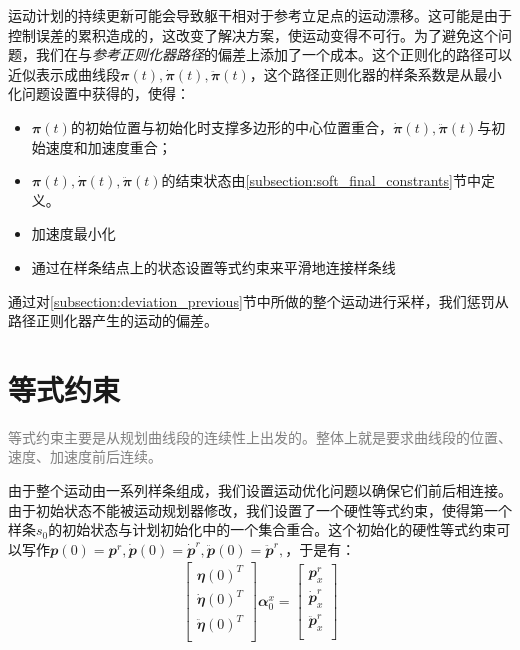 运动计划的持续更新可能会导致躯干相对于参考立足点的运动漂移。这可能是由于控制误差的累积造成的，这改变了解决方案，使运动变得不可行。为了避免这个问题，我们在与\emph{参考正则化器路径}的偏差上添加了一个成本。这个正则化的路径可以近似表示成曲线段$\mathbfit{\pi}(t),\mathbfit{\dot \pi}(t), \mathbfit{\ddot \pi}(t)$，这个路径正则化器的样条系数是从最小化问题设置中获得的，使得：
\begin{itemize}
    \item $\mathbfit{\pi}(t)$的初始位置与初始化时支撑多边形的中心位置重合，$\mathbfit{\dot \pi}(t), \mathbfit{\ddot \pi}(t)$与初始速度和加速度重合；
    \item $\mathbfit{\pi}(t),\mathbfit{\dot \pi}(t), \mathbfit{\ddot \pi}(t)$的结束状态由\ref{subsection:soft_final_constrants}节中定义。
    \item 加速度最小化
    \item 通过在样条结点上的状态设置等式约束来平滑地连接样条线
\end{itemize}

通过对\ref{subsection:deviation_previous}节中所做的整个运动进行采样，我们惩罚从路径正则化器产生的运动的偏差。


\section{等式约束}

\textcolor{gray}{\small
    等式约束主要是从规划曲线段的连续性上出发的。整体上就是要求曲线段的位置、速度、加速度前后连续。}

由于整个运动由一系列样条组成，我们设置运动优化问题以确保它们前后相连接。由于初始状态不能被运动规划器修改，我们设置了一个硬性等式约束，使得第一个样条$s_0$的初始状态与计划初始化中的一个集合重合。这个初始化的硬性等式约束可以写作$\mathbfit{p}(0)=\mathbfit{p}^r,\mathbfit{\dot p}(0)=\mathbfit{\dot p}^r,\mathbfit{\ddot p}(0)=\mathbfit{\ddot p}^r,$，于是有：
\begin{align}
    \begin{bmatrix}
        \mathbfit{\eta}(0)^T\\
        \mathbfit{\dot \eta}(0)^T\\
        \mathbfit{\ddot \eta}(0)^T\\
    \end{bmatrix} \mathbfit{\alpha}_0^x=
    \begin{bmatrix}
        \mathbfit{p}_x^r\\
        \mathbfit{\dot p}_x^r\\
        \mathbfit{\ddot p}_x^r\\
    \end{bmatrix}
\end{align}

